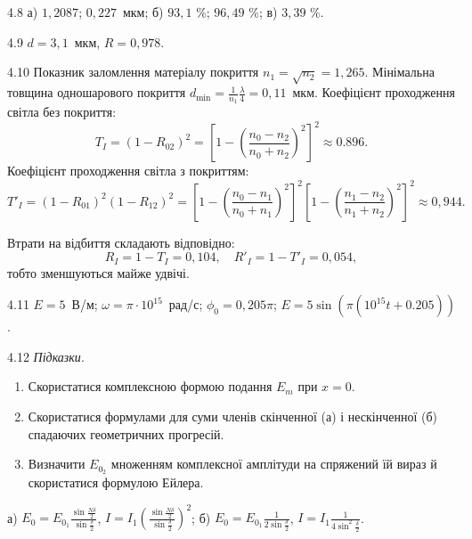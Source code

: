 \protect \section *{}
\begin{Solution}{4.{8}}
	а) $ 1,2087 $; $ 0,227 $~мкм; б) $ 93,1 $ \%; $ 96,49 $ \%; в) $ 3,39 $ \%.
\end{Solution}
\begin{Solution}{4.{9}}
    $ d =  3,1$~мкм, $ R=0,978 $.
\end{Solution}
\begin{Solution}{4.{10}}
    Показник заломлення матеріалу покриття $ n_1 = \sqrt{n_2} = 1,265  $.
    Мінімальна товщина одношарового покриття $ d_{\min} =  \frac{1}{n_1}\frac\lambda4 = 0,11$~мкм.
    Коефіцієнт проходження світла без покриття:
    \begin{equation*}
        T_I = (1 - R_{02})^2 = \left[ 1 - \left( \frac{n_0 - n_2}{n_0 + n_2}\right)^2 \right]^2 \approx 0.896.
    \end{equation*}
     Коефіцієнт проходження світла з покриттям:
     \begin{equation*}
         T'_I = (1 - R_{01})^2 (1 - R_{12})^2 = \left[ 1 - \left( \frac{n_0 - n_1}{n_0 + n_1}\right)^2 \right]^2 \left[ 1 - \left( \frac{n_1 - n_2}{n_1 + n_2}\right)^2 \right]^2 \approx 0,944.
     \end{equation*}

     Втрати на відбиття складають відповідно:
     \begin{equation*}
         R_I = 1 - T_I = 0,104, \quad R'_I = 1- T'_I = 0,054,
     \end{equation*}
     тобто зменшуються майже удвічі.
\end{Solution}
\begin{Solution}{4.{11}}
	$ E = 5 $~В/м; $\omega = \pi\cdot10^{15}$~рад/с; $\phi_0 = 0,205\pi$; $ E = 5\sin(\pi(10^{15} t + 0.205)) $.
\end{Solution}
\begin{Solution}{4.{12}}
	\emph{Підказки}.
	\begin{enumerate}
		\item  Скористатися комплексною формою подання $E_m$ при $x = 0$.
		\item  Скористатися формулами для суми членів скінченної (а) і нескінченної (б) спадаючих
		      геометричних прогресій.
		\item  Визначити $ E_{0_2} $ множенням комплексної амплітуди на спряжений їй вираз й
		      скористатися формулою Ейлера.
	\end{enumerate}
	а) $ E_0 = E_{0_1} \frac{\sin\frac{N\delta}{2}}{\sin\frac{\delta}{2}} $, $ I = I_1 \left( \frac{\sin\frac{N\delta}{2}}{\sin\frac{\delta}{2}}\right)^2 $; б) $ E_0 = E_{0_1} \frac1{2\sin\frac{\delta}{2}} $, $ I = I_1 \frac1{4\sin^2\frac{\delta}{2}} $.
\end{Solution}
